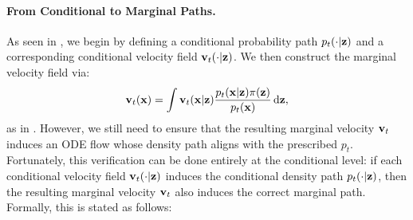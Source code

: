 
\paragraph{From Conditional to Marginal Paths.} As seen in , we begin by defining a conditional probability path $p_t(\cdot| {\mathbf{z}})$ and a corresponding conditional velocity field ${\mathbf{v}}_t(\cdot| {\mathbf{z}})$. We then construct the marginal velocity field via:
\[
    {\mathbf{v}}_t({\mathbf{x}}) 
    = \int {\mathbf{v}}_t({\mathbf{x}}| {\mathbf{z}}) \frac{p_t({\mathbf{x}}| {\mathbf{z}}) \pi({\mathbf{z}})}{p_t({\mathbf{x}})}   \mathop{}\!\mathrm{d} {\mathbf{z}},
\]
as in . However, we still need to ensure that the resulting marginal velocity ${\mathbf{v}}_t$ induces an ODE flow whose density path aligns with the prescribed $p_t$. Fortunately, this verification can be done entirely at the conditional level: if each conditional velocity field ${\mathbf{v}}_t(\cdot| {\mathbf{z}})$ induces the conditional density path $p_t(\cdot| {\mathbf{z}})$, then the resulting marginal velocity ${\mathbf{v}}_t$ also induces the correct marginal path. Formally, this is stated as follows:

